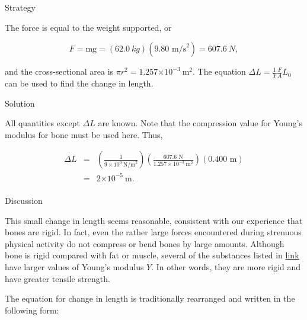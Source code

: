 \documentclass[
]{book}
\newenvironment{tinysection}{}{}
\begin{document}
\begin{tinysection}

{Strategy}

\end{tinysection}

The force is equal to the weight supported, or

\leavevmode\hypertarget{eip-843}{}%
\[{{{{F = \text{mg}} = \left( {\text{62}\text{.}0\ kg} \right)}{\left( {9\text{.}\text{80\ m}\text{/s}^{2}} \right) = \text{607}}\text{.}6\ N},}{}\]

and the cross-sectional area is
\({{{\pi r}^{2} = 1}\text{.}\text{257}{\times \text{10}^{- 3}}\ \text{m}^{2}}{}\).
The equation \({{\Delta L = \frac{1}{Y}}\frac{F}{A}L_{0}}{}\) can be used
to find the change in length.

\begin{tinysection}

{Solution}

\end{tinysection}

All quantities except \({\Delta L}{}\) are known. Note that the
compression value for Young's modulus for bone must be used here. Thus,

\leavevmode\hypertarget{eip-24}{}%
\[\begin{array}{lll}
{\Delta L} & = & {\left( \frac{1}{{9 \times \text{10}^{9}}\ \text{N/m}^{2}} \right)\left( \frac{\text{607}\text{.}\text{6\ N}}{1.{\text{257} \times \text{10}^{- 3}\ }\text{m}^{2}} \right)(0\text{.}\text{400\ m})} \\
 & = & {2{\times \text{10}^{-5}}\ \text{m.}} \\
\end{array}{}\]

\begin{tinysection}

{Discussion}

\end{tinysection}

This small change in length seems reasonable, consistent with our
experience that bones are rigid. In fact, even the rather large forces
encountered during strenuous physical activity do not compress or bend
bones by large amounts. Although bone is rigid compared with fat or
muscle, several of the substances listed in
\protect\hyperlink{import-auto-id1165298671576}{link} have larger
values of Young's modulus \(Y{}\). In other words, they are more rigid
and have greater tensile strength.

The equation for change in length is traditionally rearranged and
written in the following form:
\end{document}
